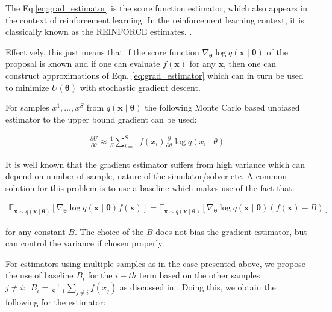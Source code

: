 The Eq.\ref{eq:grad_estimator} is the score function estimator\cite{glynn1990likelihood}, which also appears in the context of reinforcement learning. In the reinforcement learning context, it is classically known as the REINFORCE estimates. \cite{williams1992simple}. 

Effectively, this just means that if the score function $\nabla_{\boldsymbol{\theta}} \log q(\boldsymbol{x} \mid \boldsymbol{\theta})$ of the proposal is known and if one can evaluate $f(\bm{x})$ for any $\bm{x}$, then one can construct approximations of Eqn. \ref{eq:grad_estimator} which can in turn be used to minimize $U(\boldsymbol{\theta})$ with stochastic gradient descent. 

For samples $x^1, \dotsc, x^S$ from $q(\boldsymbol{x} \mid \boldsymbol{\theta})$  the following Monte Carlo based unbiased estimator to the upper bound gradient can be used:

\begin{align}
	\frac{\partial U}{\partial \theta} \approx \frac{1}{S} \sum_{i=1}^{S} f\left(x_i\right) \frac{\partial}{\partial \theta} \log q\left(x_i \mid \theta\right)
\end{align}

It is well known that the gradient estimator suffers from high variance which can depend on number of sample, nature of the simulator/solver etc. A common solution for this problem is to use a baseline \cite{williams1992simple} which makes use of the fact that:

\begin{align}
	\mathbb{E}_{\boldsymbol{x} \sim q(\boldsymbol{x} \mid \boldsymbol{\theta})}\left[\nabla_{\boldsymbol{\theta}} \log q(\boldsymbol{x} \mid \boldsymbol{\theta}) f(\boldsymbol{x})\right] = \mathbb{E}_{\boldsymbol{x} \sim q(\boldsymbol{x} \mid \boldsymbol{\theta})}\left[\nabla_{\boldsymbol{\theta}} \log q(\boldsymbol{x} \mid \boldsymbol{\theta}) (f(\boldsymbol{x}) - B)\right]
\end{align}

for any constant $B$. The choice of the $B$ does not bias the gradient estimator, but can control the variance if chosen properly. 

For estimators using multiple samples as in the case presented above, we propose the use of baseline $B_i$ for the $i-th$ term based on the other samples $j\neq i: ~~ B_i = \frac{1}{S-1} \sum_{j\neq i}f(x_j)$ as discussed in \cite{kool_buy_2022}. Doing this, we obtain the following for the estimator:

